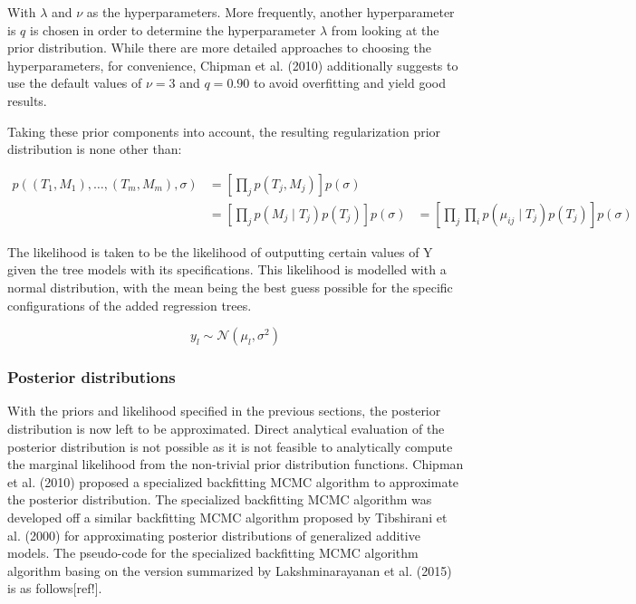 \documentclass{usiinftr}
\begin{document}
\begin{enumerate}
With $\lambda$ and $\nu$ as the hyperparameters. More frequently, another hyperparameter is $q$ is chosen in order to determine the hyperparameter $\lambda$ from looking at the prior distribution. While there are more detailed approaches to choosing the hyperparameters, for convenience, Chipman et al. (2010) additionally suggests to use the default values of $\nu = 3$ and $q = 0.90$ to avoid overfitting and yield good results.
\end{enumerate}

Taking these prior components into account, the resulting regularization prior distribution is none other 
than:

\begin{equation}
\begin{aligned}
p\left(\left(T_{1}, M_{1}\right), \ldots,\left(T_{m}, M_{m}\right), \sigma\right) &=\left[\prod_{j} p\left(T_{j}, M_{j}\right)\right] p(\sigma) \\
&=\left[\prod_{j} p\left(M_{j} \mid T_{j}\right) p\left(T_{j}\right)\right] p(\sigma)
&= \left[\prod_{j}  \prod_{i} p\left(\mu_{i j} \mid T_{j}\right) p\left(T_{j}\right)\right] p(\sigma)
\end{aligned}
\end{equation}

The likelihood is taken to be the likelihood of outputting certain values of Y given the tree models with its specifications. This likelihood is modelled with a normal distribution, with the mean being the best guess possible for the specific configurations of the added regression trees.

\begin{equation}
y_l \sim \mathcal{N}(\mu_l, \sigma^2)
\end{equation}

\subsubsection{Posterior distributions}
With the priors and likelihood specified in the previous sections, the posterior distribution is now left to be approximated. Direct analytical evaluation of the posterior distribution is not possible as it is not feasible to analytically compute the marginal likelihood from the non-trivial prior distribution functions. Chipman et al. (2010) proposed a specialized backfitting MCMC algorithm to approximate the posterior distribution. The specialized backfitting MCMC algorithm was developed off a similar backfitting MCMC algorithm proposed by Tibshirani et al. (2000) for approximating posterior distributions of generalized additive models. The pseudo-code for the specialized backfitting MCMC algorithm algorithm basing on the version summarized by Lakshminarayanan et al. (2015) is as follows[ref!].
\end{document}
